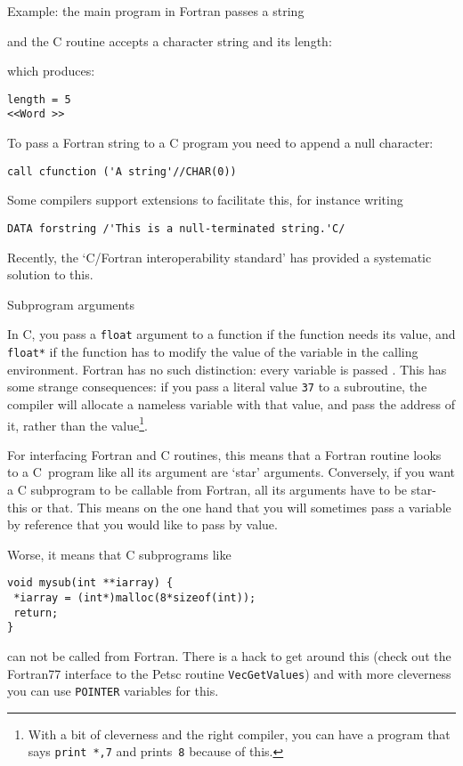Example: the main program in Fortran passes a string

and the C routine accepts a character string and its length:

which produces:
\begin{verbatim}
length = 5
<<Word >>
\end{verbatim}

To pass a Fortran string to a C program you need to append a null
character:
\begin{verbatim}
call cfunction ('A string'//CHAR(0))
\end{verbatim}
Some compilers support extensions
to facilitate this, for instance writing
\begin{verbatim}
DATA forstring /'This is a null-terminated string.'C/
\end{verbatim}
Recently, the `C/Fortran interoperability standard' has
provided a systematic solution to this.

 {Subprogram arguments}

In C, you pass a \texttt{float} argument to a function if the function
needs its value, and \texttt{float*} if the function has to modify the
value of the variable in the calling environment. Fortran has no such
distinction: every variable is passed . This
has some strange consequences: if you pass a literal value
\texttt{37} to a subroutine, the compiler will allocate a nameless
variable with that value, and pass the address of it, rather than the
value\footnote{With a bit of cleverness and the right compiler, you
  can have a program that says \texttt{print *,7} and
  prints~\texttt{8} because of this.}.

For interfacing Fortran and C routines, this means that a Fortran
routine looks to a C~program like all its argument are `star'
arguments. Conversely, if you want a C subprogram to be callable from
Fortran, all its arguments have to be star-this or that. This means on
the one hand that you will sometimes pass a variable by reference that
you would like to pass by value.

Worse, it means that C subprograms like
\begin{verbatim}
void mysub(int **iarray) {
 *iarray = (int*)malloc(8*sizeof(int));
 return;
}
\end{verbatim}
can not be called from Fortran. There is a hack to get around this
(check out the Fortran77 interface to the Petsc routine
\texttt{VecGetValues}) and with more cleverness you can use
\texttt{POINTER} variables for this.


